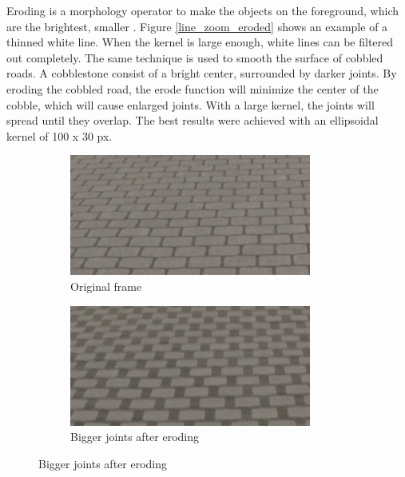\documentclass[runningheads,a4paper]{llncs}
\begin{document}
Eroding is a morphology operator to make the objects on the foreground, which are the brightest, smaller \cite{sreedhar2012enhancement}. Figure \ref{line_zoom_eroded} shows an example of a thinned white line. When the kernel is large enough, white lines can be filtered out completely. The same technique is used to smooth the surface of cobbled roads. A cobblestone consist of a bright center, surrounded by darker joints. By eroding the cobbled road, the erode function will minimize the center of the cobble, which will cause enlarged joints. With a large kernel, the joints will spread until they overlap. The best results were achieved with an ellipsoidal kernel of 100 x 30 px.

\begin{figure}[ht]
	\begin{minipage}[t]{.45\textwidth}
		\centering
		\begin{subfigure}[t]{.5\textwidth}
		  \centering
		  \includegraphics[width=.9\textwidth]{fig/cobbles_zoom_original.png}
		  \caption{Original frame\label{cobbles_zoom_original}}
		\end{subfigure}%
		\begin{subfigure}[t]{.5\textwidth}
		  \centering
		  \includegraphics[width=.9\textwidth]{fig/cobbles_zoom_eroded.png}
		  \caption{Bigger joints after eroding\label{cobbles_zoom_eroded}}
		\end{subfigure}

\end{minipage}
\end{figure}
\end{document}
